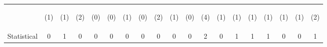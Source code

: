 \begin{tabular}{lcccccccccccccccccc}
 & \begin{footnotesize}(1)\end{footnotesize} & \begin{footnotesize}(1)\end{footnotesize} & \begin{footnotesize}(2)\end{footnotesize} & \begin{footnotesize}(0)\end{footnotesize} & \begin{footnotesize}(0)\end{footnotesize} & \begin{footnotesize}(1)\end{footnotesize} & \begin{footnotesize}(0)\end{footnotesize} & \begin{footnotesize}(2)\end{footnotesize} & \begin{footnotesize}(1)\end{footnotesize} & \begin{footnotesize}(0)\end{footnotesize} & \begin{footnotesize}(4)\end{footnotesize} & \begin{footnotesize}(1)\end{footnotesize} & \begin{footnotesize}(1)\end{footnotesize} & \begin{footnotesize}(1)\end{footnotesize} & \begin{footnotesize}(1)\end{footnotesize} & \begin{footnotesize}(1)\end{footnotesize} & \begin{footnotesize}(1)\end{footnotesize} & \begin{footnotesize}(2)\end{footnotesize}\\
\noalign{\smallskip}Statistical & 0 & 1 & 0 & 0 & 0 & 0 & 0 & 0 & 0 & 0 & 2 & 0 & 1 & 1 & 1 & 0 & 0 & 1\\

\end{tabular}
